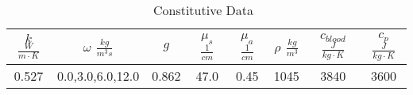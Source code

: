 \documentclass{article}
\begin{document}
\begin{table}[h]
\caption{Constitutive Data~\cite{Handbook05,Welch95,duck1990}}\label{modeldata}
\centering 
\begin{tabular}{|c|c|c|c|c|c|c|c|} \hline 
$k $ $ \frac{W}{ m \cdot K}$ & $\omega$ $\frac{kg}{m^3 s}$ &  $g$  &  $\mu_s$ $\frac{1}{cm}$  &  $\mu_a$  $\frac{1}{cm}$   &  $\rho$ $\frac{kg}{m^3}$ &   $c_{blood}$ $ \frac{J}{kg \cdot K}$ &  $c_p$ $\frac{J}{kg \cdot K}$ \\ \hline
          0.527              &     0.0,3.0,6.0,12.0        & 0.862 &        47.0              &       0.45                 &  1045                        &            3840                      &                  3600          \\ \hline
\end{tabular}
\end{table}


\end{document}
